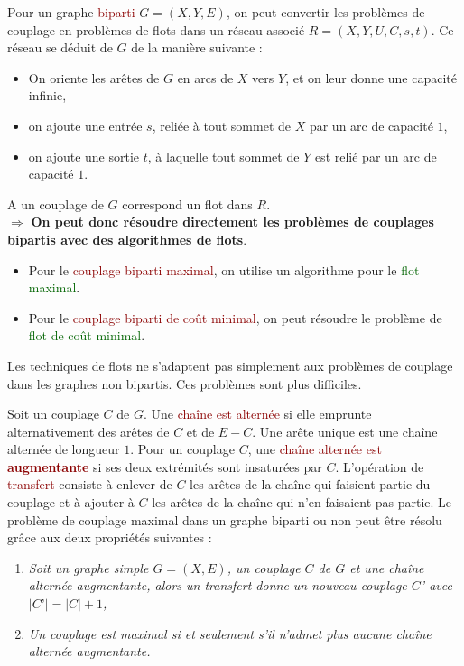 \documentclass{article}
\newcommand{\gre}[1]{\textcolor{darkgreen}{#1}}
\newcommand{\red}[1]{\textcolor{darkred}{#1}}
\begin{document}
Pour un graphe \red{biparti} $G=(X,Y,E)$, on peut convertir les problèmes de couplage en problèmes de flots dans un réseau associé $R=(X,Y,U,C,s,t)$. Ce réseau se déduit de $G$
de la manière suivante : \begin{itemize}
\item On oriente les arêtes de $G$ en arcs de $X$ vers $Y$, et on leur donne une capacité infinie,
\item on ajoute une entrée $s$, reliée à tout sommet de $X$ par un arc de capacité $1$,
\item on ajoute une sortie $t$, à laquelle tout sommet de $Y$ est relié par un arc de capacité $1$.
\end{itemize}
A un couplage de $G$ correspond un flot dans $R$. \\
$\Rightarrow$ \textbf{On peut donc résoudre directement les problèmes de couplages bipartis avec des algorithmes de flots}.

\begin{itemize}
\item Pour le \red{couplage biparti maximal}, on utilise un algorithme pour le \gre{flot maximal}.
\item Pour le \red{couplage biparti de coût minimal}, on peut résoudre le problème de \gre{flot de coût minimal}.
\end{itemize}
Les techniques de flots ne s’adaptent pas simplement aux problèmes de couplage dans les graphes non bipartis. Ces problèmes sont plus difficiles.

Soit un couplage $C$ de $G$. Une \red{chaîne est alternée} si elle emprunte alternativement des arêtes de $C$ et de $E-C$. Une arête unique est une chaîne alternée de longueur 
$1$. Pour un couplage $C$, une \red{chaîne alternée est \textbf{augmentante}} si ses deux extrémités sont insaturées par $C$. L’opération de \red{transfert} consiste à enlever 
de $C$ les arêtes de la chaîne qui faisient partie du couplage et à ajouter à $C$ les arêtes de la chaîne qui n’en faisaient pas partie. Le problème de couplage maximal dans un 
graphe biparti ou non peut être résolu grâce aux deux propriétés suivantes : 
\begin{enumerate}
\item \textit{Soit un graphe simple $G=(X,E)$, un couplage $C$ de $G$ et une chaîne alternée augmentante, alors un transfert donne un nouveau couplage $C$’ avec $|C’| = |C| + 
1$,}
\item \textit{Un couplage est maximal si et seulement s’il n’admet plus aucune chaîne alternée augmentante.} \\
\end{enumerate}
\end{document}
